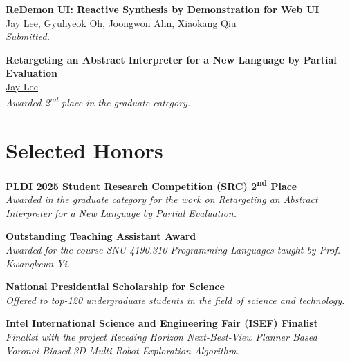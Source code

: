 \documentclass[a4paper,10pt,oneside]{memoir}
\newcommand\Rdemon{{\redemonfont ReDemon UI}}
\begin{document}
\textbf{\textsf{\Rdemon: Reactive Synthesis by Demonstration for Web UI}}\\
\ul{Jay Lee}, Gyuhyeok Oh, Joongwon Ahn, Xiaokang Qiu\\
\textit{Submitted.}
\vspace{0.5\onelineskip}

\textbf{\textsf{Retargeting an Abstract Interpreter for a New Language by Partial Evaluation}}\\
\ul{Jay Lee}\\
\textit{Awarded 2\textsuperscript{nd} place in the graduate category.}

\section{Selected Honors}
\textbf{\textsf{PLDI 2025 Student Research Competition (SRC) 2\textsuperscript{nd} Place}}\\
\textit{Awarded in the graduate category for the work on \textnormal{Retargeting an Abstract Interpreter for a New Language by Partial Evaluation.}}
\vspace{0.5\onelineskip}

\textbf{\textsf{Outstanding Teaching Assistant Award}}\\
\textit{Awarded for the course \textnormal{SNU 4190.310 Programming Languages} taught by Prof. Kwangkeun Yi.}
\vspace{0.5\onelineskip}

\textbf{\textsf{National Presidential Scholarship for Science}}\\
\textit{Offered to top-120 undergraduate students in the field of science and technology.}
\vspace{0.5\onelineskip}

\textbf{\textsf{Intel International Science and Engineering Fair (ISEF) Finalist}}\\
\textit{Finalist with the project \textnormal{Receding Horizon Next-Best-View Planner Based Voronoi-Biased 3D Multi-Robot Exploration Algorithm.}}
\vspace{0.5\onelineskip}
\end{document}

